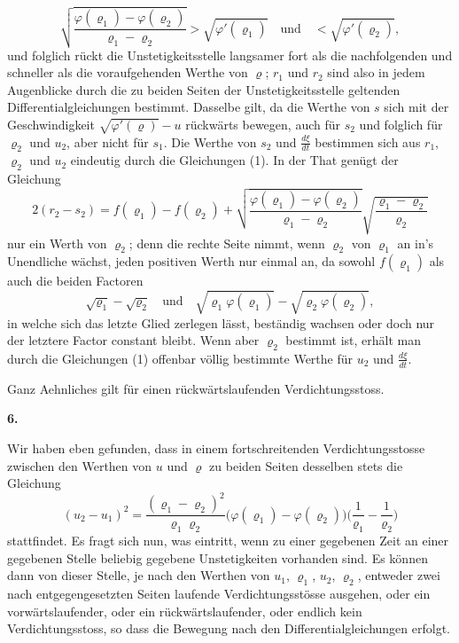 \documentclass[12pt,a4paper]{article}
\begin{document}
\[
\sqrt{\frac{\varphi(\varrho_{1}) - \varphi(\varrho_{2})}{\varrho_{1} - \varrho_{2}}} > \sqrt{\varphi'(\varrho_{1})}\quad\text{und}\quad < \sqrt{\varphi'(\varrho_{2})},
\]
und folglich r\"uckt die Unstetigkeitsstelle langsamer fort als die nachfolgenden und schneller als die voraufgehenden Werthe von $\varrho$; $r_{1}$ und $r_{2}$ sind also in jedem Augenblicke durch die zu beiden Seiten der Unstetigkeitsstelle geltenden Differentialgleichungen bestimmt. Dasselbe gilt, da die Werthe von $s$ sich mit der Geschwindigkeit $\sqrt{\varphi'(\varrho)} - u$ r\"uckw\"arts bewegen, auch f\"ur $s_{2}$ und folglich f\"ur $\varrho_{2}$ und $u_{2}$, aber nicht f\"ur $s_{1}$. Die Werthe von $s_{2}$ und $\frac{d\xi}{dt}$ bestimmen sich aus $r_{1}$, $\varrho_{2}$ und $u_{2}$ eindeutig durch die Gleichungen (1). In der That gen\"ugt der Gleichung
\begin{equation*}
2(r_{2} - s_{2}) = f(\varrho_{1}) - f(\varrho_{2}) + \sqrt{\frac{\varphi(\varrho_{1}) - \varphi(\varrho_{2})}{\varrho_{1} - \varrho_{2}}}\sqrt{\frac{\varrho_{1} - \varrho_{2}}{\varrho_{2}}}\tag{3}
\end{equation*}
nur ein Werth von $\varrho_{2}$; denn die rechte Seite nimmt, wenn $\varrho_{2}$ von $\varrho_{1}$ an in's Unendliche w\"achst, jeden positiven Werth nur einmal an, da sowohl $f(\varrho_{1})$ als auch die beiden Factoren
\[
\sqrt{\varrho_{1}} - \sqrt{\varrho_{2}}\quad\text{und}\quad\sqrt{\varrho_{1}\varphi(\varrho_{1})} - \sqrt{\varrho_{2}\varphi(\varrho_{2})},
\]
in welche sich das letzte Glied zerlegen l\"asst, best\"andig wachsen oder doch nur der letztere Factor constant bleibt. Wenn aber $\varrho_{2}$ bestimmt ist, erh\"alt man durch die Gleichungen (1) offenbar v\"ollig bestimmte Werthe f\"ur $u_{2}$ und $\frac{d\xi}{dt}$.

Ganz Aehnliches gilt f\"ur einen r\"uckw\"artslaufenden Verdichtungsstoss.

\newpage
\begin{center}
\textbf{6.}
\end{center}

Wir haben eben gefunden, dass in einem fortschreitenden Verdichtungsstosse zwischen den Werthen von $u$ und $\varrho$ zu beiden Seiten desselben stets die Gleichung
\[
(u_{2} - u_{1})^{2} = \frac{(\varrho_{1} - \varrho_{2})^{2}}{\varrho_{1}\varrho_{2}}\bigl(\varphi(\varrho_{1}) - \varphi(\varrho_{2})\bigr)\bigl(\frac{1}{\varrho_{1}} - \frac{1}{\varrho_{2}}\bigr)
\]
stattfindet. Es fragt sich nun, was eintritt, wenn zu einer gegebenen Zeit an einer gegebenen Stelle beliebig gegebene Unstetigkeiten vorhanden sind. Es k\"onnen dann von dieser Stelle, je nach den Werthen von $u_{1}$, $\varrho_{1}$, $u_{2}$, $\varrho_{2}$, entweder zwei nach entgegengesetzten Seiten laufende Verdichtungsst\"osse ausgehen, oder ein vorw\"artslaufender, oder ein r\"uckw\"artslaufender, oder endlich kein Verdichtungsstoss, so dass die Bewegung nach den Differentialgleichungen erfolgt.
\end{document}
